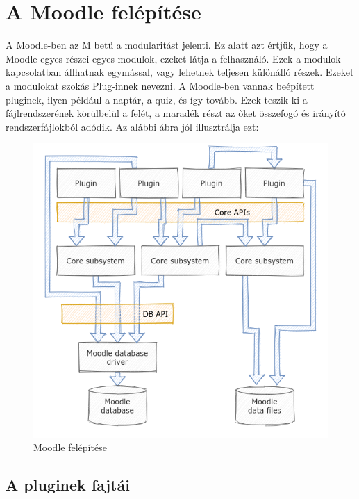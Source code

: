 \section{A Moodle felépítése}

A Moodle-ben az M betű a modularitást jelenti. Ez alatt azt értjük, hogy a Moodle egyes részei egyes modulok, ezeket látja a felhasználó. Ezek a modulok kapcsolatban állhatnak egymással, vagy lehetnek teljesen különálló részek. Ezeket a modulokat szokás Plug-innek nevezni. A Moodle-ben vannak beépített pluginek, ilyen például a naptár, a quiz, és így tovább. Ezek teszik ki a fájlrendszerének körülbelül a felét, a maradék részt az őket összefogó és irányító rendszerfájlokból adódik. Az alábbi ábra jól illusztrálja ezt:

\begin{figure}
    \centering
    \includegraphics[scale=0.7]{Fejezetek/Images/moodleBuild.png} 
    \caption{\label{Moodle}Moodle felépítése \cite{MoodleTutorial}}
\end{figure}

\subsection{A pluginek fajtái}

